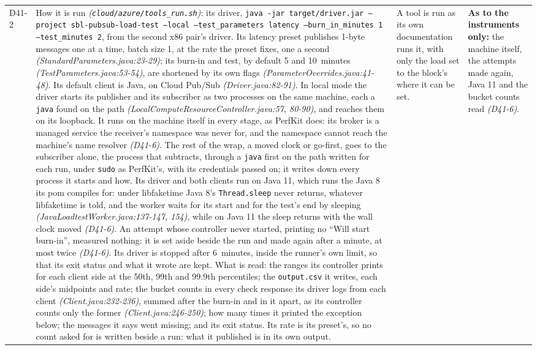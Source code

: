 \documentclass[11pt]{article}
\newcommand{\gl}[1]{{\color{soft}\itshape\small (#1)}}
\begin{document}
{\begin{longtable}{@{}p{1.1cm} >{\raggedright\arraybackslash}p{6.1cm} >{\raggedright\arraybackslash}p{6.0cm} >{\raggedright\arraybackslash}p{2.2cm}@{}}
D41-2 & How it is run \gl{\texttt{cloud/azure/tools\_run.sh}}: its driver, \texttt{java -jar target/driver.jar --project sbl-pubsub-load-test --local --test\_parameters latency --burn\_in\_minutes 1 --test\_minutes 2}, from the second x86 pair's driver. Its latency preset publishes 1-byte messages one at a time, batch size 1, at the rate the preset fixes, one a second \gl{StandardParameters.java:23-29}; its burn-in and test, by default 5 and 10~minutes \gl{TestParameters.java:53-54}, are shortened by its own flags \gl{ParameterOverrides.java:41-48}. Its default client is Java, on Cloud Pub/Sub \gl{Driver.java:82-91}. In local mode the driver starts its publisher and its subscriber as two processes on the same machine, each a \texttt{java} found on the path \gl{LocalComputeResourceController.java:57, 80-90}, and reaches them on its loopback. It runs on the machine itself in every stage, as PerfKit does: its broker is a managed service the receiver's namespace was never for, and the namespace cannot reach the machine's name resolver \gl{D41-6}. The rest of the wrap, a moved clock or go-first, goes to the subscriber alone, the process that subtracts, through a \texttt{java} first on the path written for each run, under \texttt{sudo} as PerfKit's, with its credentials passed on; it writes down every process it starts and how. Its driver and both clients run on Java 11, which runs the Java 8 its pom compiles for: under libfaketime Java 8's \texttt{Thread.sleep} never returns, whatever libfaketime is told, and the worker waits for its start and for the test's end by sleeping \gl{JavaLoadtestWorker.java:137-147, 154}, while on Java 11 the sleep returns with the wall clock moved \gl{D41-6}. An attempt whose controller never started, printing no ``Will start burn-in'', measured nothing: it is set aside beside the run and made again after a minute, at most twice \gl{D41-6}. Its driver is stopped after 6~minutes, inside the runner's own limit, so that its exit status and what it wrote are kept. What is read: the ranges its controller prints for each client side at the 50th, 99th and 99.9th percentiles; the \texttt{output.csv} it writes, each side's midpoints and rate; the bucket counts in every check response its driver logs from each client \gl{Client.java:232-236}, summed after the burn-in and in it apart, as its controller counts only the former \gl{Client.java:246-250}; how many times it printed the exception below; the messages it says went missing; and its exit status. Its rate is its preset's, so no count asked for is written beside a run: what it published is in its own output. & A tool is run as its own documentation runs it, with only the load set to the block's where it can be set. & \textbf{As to the instruments only:} the machine itself, the attempts made again, Java 11 and the bucket counts read \gl{D41-6}. \\

\end{longtable}}
\end{document}
